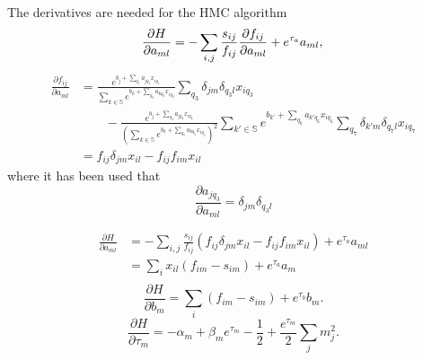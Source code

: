 \documentclass[a4paper,11pt, oneside]{article}
\theoremstyle{definition}
\begin{document}
	The derivatives are needed for the HMC algorithm
	\begin{equation}
			\frac{\partial H}{\partial a_{ml}} = -\sum_{i,j}\frac{s_{ij}}{f_{ij}}\frac{\partial f_{ij}}{\partial a_{ml}}+e^{\tau_a}a_{ml},\\
	\end{equation}
	\begin{equation}
		\begin{split}
			\frac{\partial f_{ij}}{\partial a_{ml}} & = \frac{e^{b_j+\sum_{q_1}a_{jq_1}x_{iq_1}}}{\sum_{k\in \mathbb{S}}e^{b_k+\sum_{q_2}a_{kq_2}x_{iq_2}}}\sum_{q_3}\delta_{jm}\delta_{q_3l}x_{iq_3}\\
			&\qquad-\frac{e^{b_j+\sum_{q_4}a_{jq_4}x_{iq_4}}}{(\sum_{k\in \mathbb{S}}e^{b_k+\sum_{q_5}a_{kq_5}x_{iq_5}})^2}\sum_{k'\in \mathbb{S}}e^{b_{k'}+\sum_{q_6}a_{k'q_6}x_{iq_6}}\sum_{q_7}\delta_{k'm}\delta_{q_7l}x_{iq_7}\\
			& = f_{ij}\delta_{jm}x_{il}- f_{ij}f_{im}x_{il}
		\end{split}
	\end{equation}
	where it has been used that
	\begin{equation}
		\frac{\partial a_{jq_3}}{\partial a_{ml}} = \delta_{jm}\delta_{q_3l}
	\end{equation}

	\begin{equation}
		\begin{split}
			\frac{\partial H}{\partial a_{ml}} &= -\sum_{i,j}\frac{s_{ij}}{f_{ij}}(f_{ij}\delta_{jm}x_{il}- f_{ij}f_{im}x_{il})+e^{\tau_a}a_{ml}\\
			& = \sum_ix_{il}(f_{im}-s_{im})+e^{\tau_a}a_m\\
		\end{split}
	\end{equation}
	\begin{equation}
			\frac{\partial H}{\partial b_m} = \sum_i(f_{im}-s_{im})+e^{\tau_b}b_m.
	\end{equation}
	\begin{equation}
		\frac{\partial H}{\partial \tau_m} = -\alpha_m+\beta_me^{\tau_m}-\frac{1}{2}+\frac{e^{\tau_m}}{2}\sum_jm_j^2.
	\end{equation}
	
\end{document}
